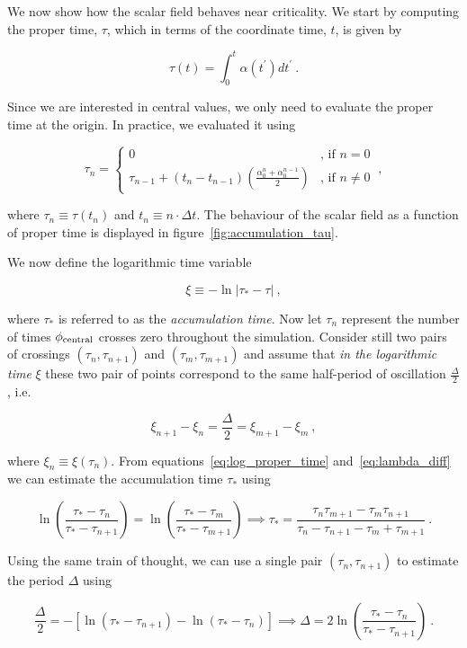 \documentclass[a4paper,11pt]{article}
\renewcommand{\a}{\alpha}
\newcommand{\D}{\Delta}
\newcommand{\dt}{\Delta t}
\newcommand{\lrpar}[1]{\left( #1 \right)}
\newcommand{\lrsquare}[1]{\left[ #1 \right]}
\newcommand{\abs}[1]{\left| #1 \right|}
\newcommand{\n}{\noindent}
\newcommand{\eq}[1]{
  \begin{equation}
    #1
  \end{equation}
}
\begin{document}
We now show how the scalar field behaves near criticality. We start by computing the proper time, $\tau$, which in terms of the coordinate time, $t$, is given by

\eq{
  \tau(t) = \int_{0}^{t}\a\lrpar{t^{\prime}}dt^{\prime}\ .
}

\n Since we are interested in central values, we only need to evaluate the proper time at the origin. In practice, we evaluated it using

\eq{
  \tau_{n} = \left\{
  \begin{matrix}
    0 & \text{, if } n=0\\
    \tau_{n-1} + \left(t_{n}-t_{n-1}\right)\lrpar{\frac{\alpha^{n}_{0}+\alpha^{n-1}_{0}}{2}} & \text{, if } n\neq0
  \end{matrix}
  \right.\ ,
}

\n where $\tau_{n}\equiv\tau(t_{n})$ and $t_{n}\equiv n\cdot\dt$. The behaviour of the scalar field as a function of proper time is displayed in figure~\ref{fig:accumulation_tau}.

We now define the logarithmic time variable

\eq{
  \xi \equiv -\ln\abs{\tau_{*}-\tau}\ ,\label{eq:log_proper_time}
}

\n where $\tau_{*}$ is referred to as the \emph{accumulation time}. Now let $\tau_{n}$ represent the number of times $\phi_{\rm central}$ crosses zero throughout the simulation. Consider still two pairs of crossings $\lrpar{\tau_{n},\tau_{n+1}}$ and $\lrpar{\tau_{m},\tau_{m+1}}$ and assume that \emph{in the logarithmic time} $\xi$ these two pair of points correspond to the same half-period of oscillation $\frac{\D}{2}$, i.e.

\eq{
  \xi_{n+1}-\xi_{n} = \frac{\D}{2} = \xi_{m+1}-\xi_{m}\ ,\label{eq:lambda_diff}
}

\n where $\xi_{n} \equiv \xi\lrpar{\tau_{n}}$. From equations~\eqref{eq:log_proper_time} and~\eqref{eq:lambda_diff} we can estimate the accumulation time $\tau_{*}$ using

\eq{
  \ln\lrpar{\frac{\tau_{*}-\tau_{n}}{\tau_{*}-\tau_{n+1}}} = \ln\lrpar{\frac{\tau_{*}-\tau_{m}}{\tau_{*}-\tau_{m+1}}} \implies \tau_{*} = \frac{\tau_{n}\tau_{m+1}-\tau_{m}\tau_{n+1}}{\tau_{n}-\tau_{n+1}-\tau_{m}+\tau_{m+1}}\ . \label{eq:tau_star}
}

Using the same train of thought, we can use a single pair $\lrpar{\tau_{n},\tau_{n+1}}$ to estimate the period $\D$ using

\eq{
  \frac{\D}{2} = -\lrsquare{\ln\lrpar{\tau_{*}-\tau_{n+1}} - \ln\lrpar{\tau_{*}-\tau_{n}}} \implies \D = 2\ln\lrpar{ \frac{\tau_{*}-\tau_{n}}{\tau_{*}-\tau_{n+1}} }\ .\label{eq:Delta_method2}
}
\end{document}
